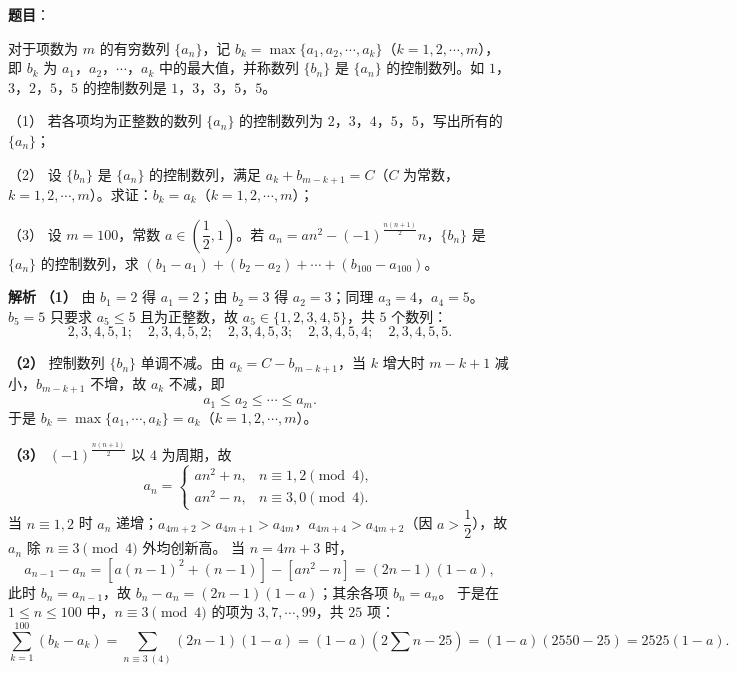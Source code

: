 \begin{answer}

\textbf{题目}：

对于项数为 $m$ 的有穷数列 $\{a_n\}$，记 $b_k=\max\{a_1,a_2,\cdots,a_k\}$（$k=1,2,\cdots,m$），即 $b_k$ 为 $a_1$，$a_2$，$\cdots$，$a_k$ 中的最大值，并称数列 $\{b_n\}$ 是 $\{a_n\}$ 的控制数列。如 $1$，$3$，$2$，$5$，$5$ 的控制数列是 $1$，$3$，$3$，$5$，$5$。

（1） 若各项均为正整数的数列 $\{a_n\}$ 的控制数列为 $2$，$3$，$4$，$5$，$5$，写出所有的 $\{a_n\}$；

（2） 设 $\{b_n\}$ 是 $\{a_n\}$ 的控制数列，满足 $a_k+b_{m-k+1}=C$（$C$ 为常数，$k=1,2,\cdots,m$）。求证：$b_k=a_k$（$k=1,2,\cdots,m$）；

（3） 设 $m=100$，常数 $a\in\left(\dfrac12,1\right)$。若 $a_n=an^2-(-1)^{\frac{n(n+1)}2}n$，$\{b_n\}$ 是 $\{a_n\}$ 的控制数列，求 $(b_1-a_1)+(b_2-a_2)+\cdots+(b_{100}-a_{100})$。

\clearpage

\textbf{解析}
\textbf{（1）} 由 $b_1=2$ 得 $a_1=2$；由 $b_2=3$ 得 $a_2=3$；同理 $a_3=4$，$a_4=5$。$b_5=5$ 只要求 $a_5\leqslant5$ 且为正整数，故 $a_5\in\{1,2,3,4,5\}$，共 $5$ 个数列：
\nopagebreak[4]
\[2,3,4,5,1;\quad2,3,4,5,2;\quad2,3,4,5,3;\quad2,3,4,5,4;\quad2,3,4,5,5.\]

\textbf{（2）} 控制数列 $\{b_n\}$ 单调不减。由 $a_k=C-b_{m-k+1}$，当 $k$ 增大时 $m-k+1$ 减小，$b_{m-k+1}$ 不增，故 $a_k$ 不减，即
\nopagebreak[4]
\[a_1\leqslant a_2\leqslant\cdots\leqslant a_m.\]
于是 $b_k=\max\{a_1,\cdots,a_k\}=a_k$（$k=1,2,\cdots,m$）。

\textbf{（3）} $(-1)^{\frac{n(n+1)}2}$ 以 $4$ 为周期，故
\nopagebreak[4]
\[a_n=\begin{cases}an^2+n,&n\equiv1,2\pmod 4,\\ an^2-n,&n\equiv3,0\pmod 4.\end{cases}\]
当 $n\equiv1,2$ 时 $a_n$ 递增；$a_{4m+2}>a_{4m+1}>a_{4m}$，$a_{4m+4}>a_{4m+2}$（因 $a>\dfrac12$），故 $a_n$ 除 $n\equiv3\pmod4$ 外均创新高。
当 $n=4m+3$ 时，
\nopagebreak[4]
\[a_{n-1}-a_n=\left[a(n-1)^2+(n-1)\right]-\left[an^2-n\right]=(2n-1)(1-a),\]
此时 $b_n=a_{n-1}$，故 $b_n-a_n=(2n-1)(1-a)$；其余各项 $b_n=a_n$。
于是在 $1\leqslant n\leqslant100$ 中，$n\equiv3\pmod4$ 的项为 $3,7,\cdots,99$，共 $25$ 项：
\nopagebreak[4]
\[\sum_{k=1}^{100}(b_k-a_k)=\sum_{n\equiv3\ (4)}(2n-1)(1-a)=(1-a)\left(2\sum n-25\right)=(1-a)(2550-25)=2525(1-a).\]




\end{answer}
